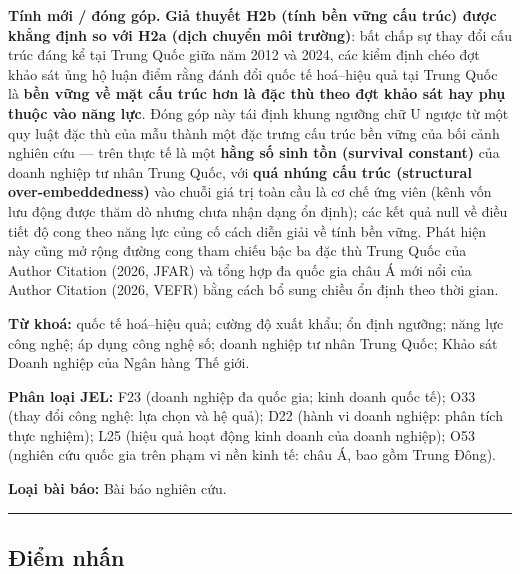 \documentclass[12pt,a4paper]{article}
\begin{document}
\textbf{Tính mới / đóng góp.} \textbf{Giả thuyết H2b (tính bền vững cấu
trúc) được khẳng định so với H2a (dịch chuyển môi trường)}: bất chấp sự
thay đổi cấu trúc đáng kể tại Trung Quốc giữa năm 2012 và 2024, các kiểm
định chéo đợt khảo sát ủng hộ luận điểm rằng đánh đổi quốc tế hoá--hiệu
quả tại Trung Quốc là \textbf{bền vững về mặt cấu trúc hơn là đặc thù
theo đợt khảo sát hay phụ thuộc vào năng lực}. Đóng góp này tái định
khung ngưỡng chữ U ngược từ một quy luật đặc thù của mẫu thành một đặc
trưng cấu trúc bền vững của bối cảnh nghiên cứu --- trên thực tế là một
\textbf{hằng số sinh tồn (survival constant)} của doanh nghiệp tư nhân
Trung Quốc, với \textbf{quá nhúng cấu trúc (structural
over-embeddedness)} vào chuỗi giá trị toàn cầu là cơ chế ứng viên (kênh
vốn lưu động được thăm dò nhưng chưa nhận dạng ổn định); các kết quả
null về điều tiết độ cong theo năng lực củng cố cách diễn giải về tính
bền vững. Phát hiện này cũng mở rộng đường cong tham chiếu bậc ba đặc
thù Trung Quốc của Author Citation (2026, JFAR) và tổng hợp đa quốc gia
châu Á mới nổi của Author Citation (2026, VEFR) bằng cách bổ sung chiều
ổn định theo thời gian.

\textbf{Từ khoá:} quốc tế hoá--hiệu quả; cường độ xuất khẩu; ổn định
ngưỡng; năng lực công nghệ; áp dụng công nghệ số; doanh nghiệp tư nhân
Trung Quốc; Khảo sát Doanh nghiệp của Ngân hàng Thế giới.

\textbf{Phân loại JEL:} F23 (doanh nghiệp đa quốc gia; kinh doanh quốc
tế); O33 (thay đổi công nghệ: lựa chọn và hệ quả); D22 (hành vi doanh
nghiệp: phân tích thực nghiệm); L25 (hiệu quả hoạt động kinh doanh của
doanh nghiệp); O53 (nghiên cứu quốc gia trên phạm vi nền kinh tế: châu
Á, bao gồm Trung Đông).

\textbf{Loại bài báo:} Bài báo nghiên cứu.

\begin{center}\rule{0.5\linewidth}{0.5pt}\end{center}

\hypertarget{ux111iux1ec3m-nhux1ea5n}{%
\subsection{Điểm nhấn}\label{ux111iux1ec3m-nhux1ea5n}}
\end{document}
